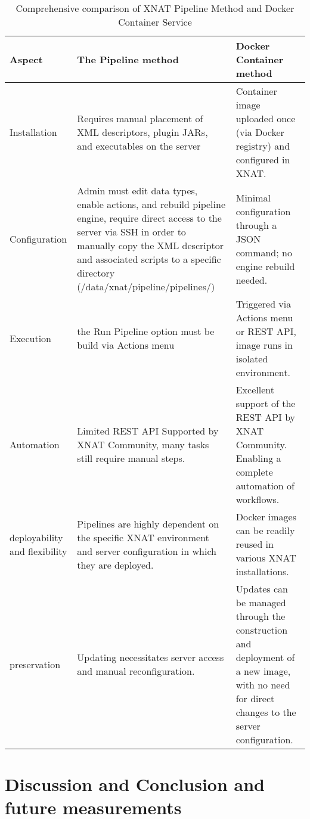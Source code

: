 \begin{table}[h]
    \centering
    \begin{tabular}{|p{4cm}|p{5cm}|p{5cm}|}
    \hline
    \textbf{Aspect} & \textbf{The Pipeline method} & \textbf{Docker Container method}\\ \hline
     Installation & Requires manual placement of XML descriptors, plugin JARs, and executables on the server& Container image uploaded once (via Docker registry) and configured in XNAT. \\ \hline
    Configuration & Admin must edit data types, enable actions, and rebuild pipeline engine, require direct access to the server via SSH in order to manually copy the XML
descriptor and associated scripts to a specific directory (/data/xnat/pipeline/pipelines/)& Minimal configuration through a JSON command; no engine rebuild needed. \\ \hline
Execution & the Run Pipeline option must be build via Actions menu& Triggered via Actions menu or REST API, image runs in isolated environment. \\ \hline
Automation & Limited REST API Supported by XNAT Community, many tasks still require manual steps.& Excellent support of the REST API by XNAT Community. Enabling a complete automation of workflows. \\ \hline
deployability and flexibility & Pipelines are highly dependent on the specific XNAT environment and server configuration in which they are deployed. & Docker images can be readily reused in various XNAT installations.\\ \hline
preservation & Updating necessitates server access and manual reconfiguration.& Updates can be managed through the construction and deployment of a new image, with no need for direct changes to the server configuration.\\ \hline






    \end{tabular}
    \caption{Comprehensive comparison of XNAT Pipeline Method and Docker Container Service}
    \label{tab:pipeline-vs-docker}
\end{table}


















\section{Discussion and Conclusion and future measurements}


